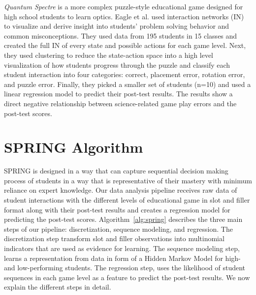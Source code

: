 \documentclass{sigchi}
\def\algname{SPRING\xspace}
\begin{document}
\textit {Quantum Spectre} is a more complex puzzle-style educational game designed for high school students to learn optics. 
Eagle et al. \cite{eagle2015measuring} used interaction networks (IN) to visualize and derive insight into students' problem solving behavior and common misconceptions. 
They used data from 195 students in 15 classes and created the full IN of every state and possible actions for each game level. 
Next, they used clustering to reduce the state-action space into a high level visualization of how students progress through the puzzle and classify each student interaction into four categories: correct, placement error, rotation error, and puzzle error. 
Finally, they picked a smaller set of students (n=10) and used a linear regression model to predict their post-test results.
The results show a direct negative relationship between science-related game play errors and the post-test scores.

\section{SPRING Algorithm}

\algname is designed in a way that can capture sequential decision making process of students in a way that is representative of their mastery with minimum reliance on expert knowledge. 
Our data analysis pipeline receives raw data of student interactions with the different levels of educational game in slot and filler format along with their post-test results and creates a regression model for predicting the post-test scores. 
Algorithm~\ref{alg:spring} describes the three main steps of our pipeline: discretization,  sequence modeling, and regression.
The discretization step transform slot and filler observations into multinomial indicators that are used as evidence for learning.
The sequence modeling step, learns a representation from data in form of a Hidden Markov Model for high- and low-performing students.
The regression step, uses the likelihood of student sequences in each game level as a feature to predict the post-test results.
We now explain the different steps in detail.
\end{document}
